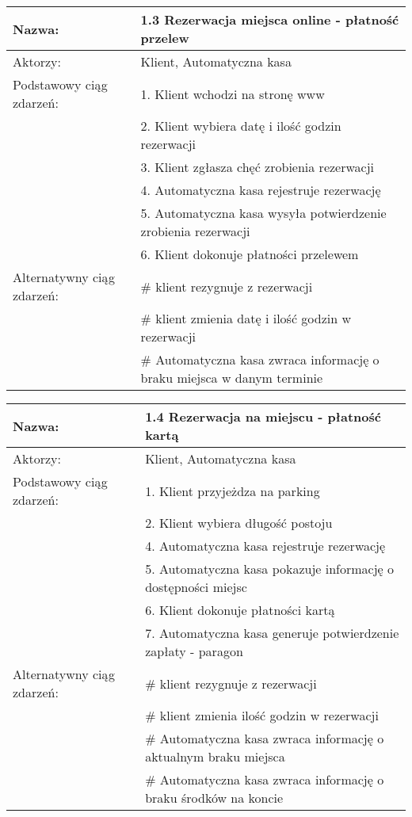 \begin{center}
\begin{tabular}{|L{3cm}  L{13cm}|}
\hline
Nazwa: & 1.3 Rezerwacja miejsca online - płatność przelew \\ \hline
Aktorzy: & Klient,  Automatyczna kasa \\ \hline
Podstawowy ciąg zdarzeń: & 1. Klient wchodzi na stronę www \\
 & 2. Klient wybiera datę i ilość godzin rezerwacji \\
 & 3. Klient zgłasza chęć zrobienia rezerwacji \\
 & 4. Automatyczna kasa rejestruje rezerwację \\
 & 5. Automatyczna kasa wysyła potwierdzenie zrobienia rezerwacji \\
 & 6. Klient dokonuje płatności przelewem \\ \hline
Alternatywny ciąg zdarzeń:  & \# klient rezygnuje z rezerwacji \\
 & \# klient zmienia datę i ilość godzin w rezerwacji \\ 
 & \# Automatyczna kasa zwraca informację o braku miejsca w danym terminie\\ \hline
\end{tabular}

\vspace{1cm}

\begin{tabular}{|L{3cm}  L{13cm}|}
\hline
Nazwa: & 1.4 Rezerwacja na miejscu - płatność kartą \\ \hline
Aktorzy: & Klient,  Automatyczna kasa \\ \hline
Podstawowy ciąg zdarzeń: & 1. Klient przyjeżdza na parking \\
 & 2. Klient wybiera długość postoju \\
 & 4. Automatyczna kasa rejestruje rezerwację \\
 & 5. Automatyczna kasa pokazuje informację o dostępności miejsc \\
 & 6. Klient dokonuje płatności kartą \\
 & 7. Automatyczna kasa generuje potwierdzenie zapłaty - paragon \\ \hline
Alternatywny ciąg zdarzeń:  & \# klient rezygnuje z rezerwacji \\
 & \# klient zmienia ilość godzin w rezerwacji \\ 
 & \# Automatyczna kasa zwraca informację o aktualnym braku miejsca\\ 
 & \# Automatyczna kasa zwraca informację o braku środków na koncie \\ \hline
\end{tabular}


\end{center}
